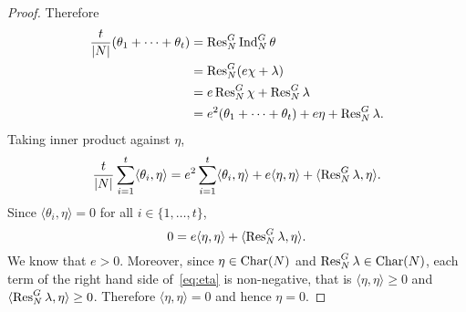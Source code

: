 \begin{proof}
    \bigskip 
    Therefore 
    \begin{align*}
        \frac{t}{|N|}(\theta_1+\cdots+\theta_t)
        &=\operatorname{Res}_N^G\operatorname{Ind}_N^G\theta\\
        &=\operatorname{Res}_N^G(e\chi+\lambda)\\
        &=e\operatorname{Res}_N^G\chi+\operatorname{Res}_N^G\lambda\\
        &=e^2(\theta_1+\cdots+\theta_t)+e\eta+\operatorname{Res}_N^G\lambda.
    \end{align*}
    Taking inner product against $\eta$,  
    \[
    \frac{t}{|N|}\sum_{i=1}^t\langle\theta_i,\eta\rangle 
    =e^2\sum_{i=1}^t\langle\theta_i,\eta\rangle+e\langle\eta,\eta\rangle+\langle\operatorname{Res}_N^G\lambda,\eta\rangle. 
    \]
    Since $\langle\theta_i,\eta\rangle=0$ for all $i\in\{1,\dots,t\}$, 
    \begin{equation}
    \label{eq:eta}
    0=e\langle\eta,\eta\rangle+\langle\operatorname{Res}_N^G\lambda,\eta\rangle.
    \end{equation}
    We know that $e>0$. Moreover, since $\eta\in\operatorname{Char}(N)$ and 
    $\operatorname{Res}_N^G\lambda\in\operatorname{Char}(N)$, each term of the right hand side of~\eqref{eq:eta} is non-negative, that is 
    $\langle\eta,\eta\rangle\geq0$ and 
    $\langle\operatorname{Res}_N^G\lambda,\eta\rangle\geq0$. Therefore 
    $\langle\eta,\eta\rangle=0$ and hence $\eta=0$. 
\end{proof}

    

